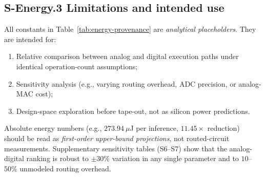 \subsection*{S-Energy.3 Limitations and intended use}

All constants in Table~\ref{tab:energy-provenance} are \emph{analytical placeholders}.  They are intended for:
\begin{enumerate}[leftmargin=1.2em]
    \item Relative comparison between analog and digital execution paths under identical operation-count assumptions;
    \item Sensitivity analysis (e.g., varying routing overhead, ADC precision, or analog-MAC cost);
    \item Design-space exploration before tape-out, not as silicon power predictions.
\end{enumerate}

Absolute energy numbers (e.g., $273.94~\mu$J per inference, $11.45\times$ reduction) should be read as \emph{first-order upper-bound projections}, not routed-circuit measurements.  Supplementary sensitivity tables (S6--S7) show that the analog-digital ranking is robust to $\pm 30\%$ variation in any single parameter and to $10$--$50\%$ unmodeled routing overhead.
